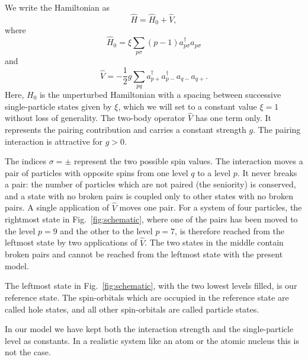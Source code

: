 \documentclass[prc]{revtex4}
\begin{document}
We write the Hamiltonian as
\[ \hat{H} = \hat{H}_0 + \hat{V} , \]
where
\[
\hat{H}_0=\xi\sum_{p\sigma}(p-1)a_{p\sigma}^{\dagger}a_{p\sigma}
\]
and
\[
\hat{V}=-\frac{1}{2}g\sum_{pq}a^{\dagger}_{p+}
a^{\dagger}_{p-}a_{q-}a_{q+}.
\]
Here, $H_0$ is the unperturbed Hamiltonian with a spacing between
successive single-particle states given by $\xi$, which we will set to
a constant value $\xi=1$ without loss of generality. The two-body
operator $\hat{V}$ has one term only. It represents the pairing
contribution and carries a constant strength $g$. The pairing
interaction is attractive for $g>0$.

The indices $\sigma=\pm$ represent the two possible spin values. The
interaction moves a pair of particles with opposite spins from one
level $q$ to a level $p$. It never breaks a pair: the number of
particles which are not paired (the seniority) is conserved, and a
state with no broken pairs is coupled only to other states with no
broken pairs. A single application of $\hat{V}$ moves one pair. For a
system of four particles, the rightmost state in
Fig.~\ref{fig:schematic}, where one of the pairs has been moved to the
level $p=9$ and the other to the level $p=7$, is therefore reached
from the leftmost state by two applications of $\hat{V}$. The two
states in the middle contain broken pairs and cannot be reached from
the leftmost state with the present model.

The leftmost state in Fig.~\ref{fig:schematic}, with the two lowest
levels filled, is our reference state. The spin-orbitals which are
occupied in the reference state are called hole states, and all other
spin-orbitals are called particle states.

In our model we have kept both the interaction strength and the
single-particle level as constants.  In a realistic system like an
atom or the atomic nucleus this is not the case.
\end{document}
